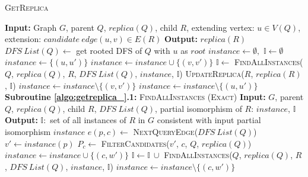 \begin{algorithm}
	\caption{\textsc{GetReplica}}\label{algo:getreplica_}
	\dontprintsemicolon
	\nonl \textbf{Input:} Graph $G$, parent $Q$, $replica(Q)$, child $R$, extending vertex: $u\in V(Q)$, extension: $candidate\ edge (u,v) \in E(R)$\;
	\nonl \textbf{Output:} $replica(R)$ \;
	\vspace{0.3mm}
	$DFS\ List(Q)\leftarrow$ get rooted \textsc{DFS} of $Q$ with $u$ as $root$ \;
	$instance \leftarrow \emptyset, $ $ \mathbb{I} \leftarrow \emptyset$\;
	{
		$instance\leftarrow \{(u,u')\}$ \;
		{
			$instance\leftarrow instance \cup \{(v,v')\}$\;
	$\mathbb{I}\leftarrow$ \textsc{FindAllInstances($Q$, $replica(Q)$, $R$,
	$DFS\ List(Q)$, $instance$, $\mathbb{I}$)}\;
			\textsc{UpdateReplica($R$, $replica(R)$, $\mathbb{I}$)}\;
			$instance\leftarrow instance \setminus \{(v,v')\}$\;
		}
		$instance\leftarrow instance \setminus \{(u,u')\}$\;
	}
	\;
	\vspace{2mm}
	\setcounter{AlgoLine}{0}
	\nonl \textbf{Subroutine \ref{algo:getreplica_}.1:} \textsc{FindAllInstances
	(Exact)} \;
	\vspace{0.3mm}
	\nonl \textbf{Input:} $G$, parent $Q$, $replica(Q)$, child $R$, $DFS\ List(Q)$, partial isomorphism of $R$: $instance$, $\mathbb{I}$\;
	\nonl \textbf{Output:} $\mathbb{I}: $ set of all instances of $R$ in $G$ consistent with input partial isomorphism $instance$\;
	{
	}
	\Else
	{
		$e(p,c) \leftarrow$ \textsc{NextQueryEdge($DFS\ List(Q)$)}\;
		$v' \leftarrow instance(p)$\;
		$P_{c} \leftarrow$ \textsc{FilterCandidates($v'$, $c$, $Q$, $replica(Q)$)}\;
		{
			$instance \leftarrow instance \cup \{(c,w')\}$\;
		$\mathbb{I} \leftarrow \mathbb{I}\ \cup$ \textsc{FindAllInstances($Q$,
		$replica(Q)$, $R$, $DFS\ List(Q)$, $instance$, $\mathbb{I}$)}\;
			$instance \leftarrow instance \setminus \{(c,w')\}$\;
		}
		\;
	}
\end{algorithm}

